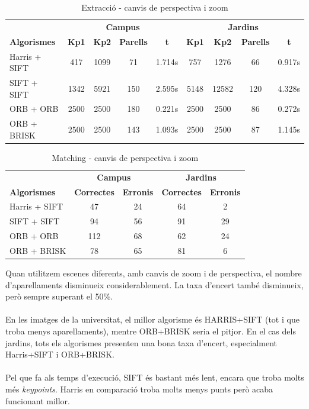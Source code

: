 		\begin{table}[H]
			\begin{center}
				\begin{tabular}{l | c c c c | c c c c}
					& \multicolumn{4}{c|}{\textbf{Campus}} & \multicolumn{4}{c}{\textbf{Jardins}} \\
					\textbf{Algorismes} & \textbf{Kp1} & \textbf{Kp2} & \textbf{Parells} & \textbf{t} & \textbf{Kp1} & \textbf{Kp2} & \textbf{Parells} & \textbf{t} \\ \hline
					Harris + SIFT & 417 & 1099 & 71 & 1.714s & 757 & 1276 & 66 & 0.917s \\
					SIFT + SIFT & 1342 & 5921 & 150 & 2.595s & 5148 & 12582 & 120 & 4.328s \\
					ORB + ORB & 2500 & 2500 & 180 & 0.221s & 2500 & 2500 & 86 & 0.272s \\
					ORB + BRISK & 2500 & 2500 & 143 & 1.093s & 2500 & 2500 & 87 & 1.145s \\
				\end{tabular}
			\end{center}
			\caption{Extracció - canvis de perspectiva i zoom}
		\end{table}

		\begin{table}[H]
			\begin{center}
				\begin{tabular}{l | c c | c c}
					& \multicolumn{2}{c|}{\textbf{Campus}} & \multicolumn{2}{c}{\textbf{Jardins}} \\
					\textbf{Algorismes} & \textbf{Correctes} & \textbf{Erronis} & \textbf{Correctes} & \textbf{Erronis} \\ \hline
					Harris + SIFT & 47 & 24 & 64 & 2 \\
					SIFT + SIFT & 94 & 56 & 91 & 29 \\
					ORB + ORB & 112 & 68 & 62 & 24 \\
					ORB + BRISK & 78 & 65 & 81 & 6 \\
				\end{tabular}
			\end{center}
			\caption{Matching - canvis de perspectiva i zoom}
		\end{table}
		\noindent
		Quan utilitzem escenes diferents, amb canvis de zoom i de perspectiva, el nombre d'aparellaments disminueix considerablement. La taxa d'encert també disminueix, però sempre superant el 50\%.\\\\
		En les imatges de la universitat, el millor algorisme és HARRIS+SIFT (tot i que troba menys aparellaments), mentre ORB+BRISK seria el pitjor. En el cas dels jardins, tots els algorismes presenten
		una bona taxa d'encert, especialment Harris+SIFT i ORB+BRISK.\\\\
		Pel que fa als temps d'execució, SIFT és bastant més lent, encara que troba molts més \textit{keypoints}. Harris en comparació troba molts menys punts però acaba funcionant millor.\\
		
